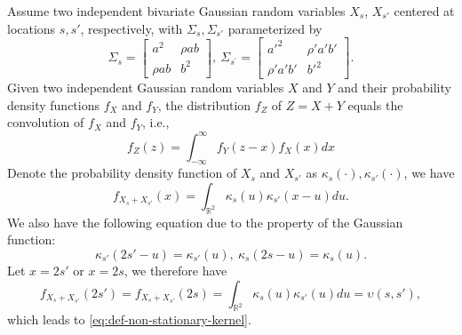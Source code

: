 \documentclass[journal]{IEEEtran}
\begin{document}
Assume two independent bivariate Gaussian random variables $X_s$, $X_{s'}$ centered at locations $s, s'$, respectively, with $\Sigma_s, \Sigma_{s'}$ parameterized by
\[
\Sigma_s = \begin{bmatrix} a^2 & \rho a b \\ \rho a b & b^2 \end{bmatrix},~\Sigma_{s^{'}} = \begin{bmatrix} {a'}^2 & \rho' a' b' \\ \rho' a' b' & {b'}^2 \end{bmatrix}.
\]
Given two independent Gaussian random variables $X$ and $Y$ and their probability density functions $f_X$ and $f_Y$, the distribution $f_Z$ of $Z = X + Y$ equals the convolution of $f_X$ and $f_Y$, i.e., 
\[
    f_Z(z) = \int_{-\infty}^{\infty} f_Y(z-x) f_X(x) dx
\]
Denote the probability density function of $X_s$ and $X_{s'}$ as $\kappa_s(\cdot), \kappa_{s'}(\cdot)$, we have 
\[
f_{X_s+X_{s'}}(x) = \int_{\mathbb{R}^2} \kappa_s(u)\kappa_{s'}(x-u)du.
\] 
We also have the following equation due to the property of the Gaussian function:
\[
\kappa_{s'}(2s'-u) = \kappa_{s'}(u),~
\kappa_{s}(2s-u) = \kappa_s(u).
\]
Let $x = 2s'$ or $x = 2s$, we therefore have
\[
f_{X_s+X_{s'}}(2s') = f_{X_s+X_{s'}}(2s) = \int_{\mathbb{R}^2} \kappa_s(u)\kappa_{s'}(u)du = \upsilon(s, s'),
\]
which leads to \eqref{eq:def-non-stationary-kernel}.
\end{document}
